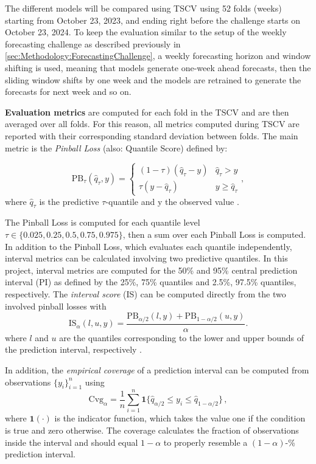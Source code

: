 The different models will be compared using TSCV using 52 folds (weeks) starting from October 23, 2023, and ending right before the challenge starts on October 23, 2024. To keep the evaluation similar to the setup of the weekly forecasting challenge as described previously in \cref{sec:Methodology:ForecastingChallenge}, a weekly forecasting horizon and window shifting is used, meaning that models generate one-week ahead forecasts, then the sliding window shifts by one week and the models are retrained to generate the forecasts for next week and so on.

\textbf{Evaluation metrics} are computed for each fold in the TSCV and are then averaged over all folds. For this reason, all metrics computed during TSCV are reported with their corresponding standard deviation between folds. The main metric is the \textit{Pinball Loss} (also: Quantile Score) defined by:

\begin{equation}
\label{eq:PinballLoss}
\text{PB}_{\tau}(\hat{q}_{\tau}, y) = 
\begin{cases} 
(1 - \tau) (\hat{q}_{\tau} - y) & \hat{q}_{\tau} > y \\
\tau (y - \hat{q}_{\tau}) & y \geq \hat{q}_{\tau}
\end{cases}
,
\end{equation}
where $\hat{q}_\tau$ is the predictive $\tau$-quantile and y the observed value \parencite[Chapter~5.9]{hyndman_forecasting_2021}.

The Pinball Loss is computed for each quantile level $\tau \in \{0.025, 0.25, 0.5, 0.75, 0.975\}$, then a sum over each Pinball Loss is computed. In addition to the Pinball Loss, which evaluates each quantile independently, interval metrics can be calculated involving two predictive quantiles. In this project, interval metrics are computed for the 50\% and 95\% central prediction interval (PI) as defined by the 25\%, 75\% quantiles and 2.5\%, 97.5\% quantiles, respectively. The \textit{interval score} (IS) can be computed directly from the two involved pinball losses with
\begin{equation}
\label{eq:IntervalScore}
\text{IS}_{\alpha}(l, u, y) = \frac{\text{PB}_{\alpha/2}(l, y) + \text{PB}_{1-\alpha/2}(u, y)}{\alpha}.
\end{equation}
where $l$ and $u$ are the quantiles corresponding to the lower and upper bounds of the prediction interval, respectively \parencite[370]{gneiting_strictly_2007}. 

In addition, the \textit{empirical coverage} of a prediction interval can be computed from 
observations $\{y_i\}_{i=1}^{n}$ using
\begin{equation}
    \text{Cvg}_{\alpha} = \frac{1}{n} \sum_{i = 1}^{n} \mathbf{1}\{ \hat{q}_{\alpha/2} \leq y_i \leq \hat{q}_{1 - \alpha /2 } \} \,,
\end{equation}
where $\mathbf{1}(\cdot)$ is the indicator function, which takes the value one if the condition is true and zero otherwise.
The coverage calculates the fraction of observations inside the interval and should equal $1 - \alpha$ to properly resemble a $(1 - \alpha)$-\% prediction interval.


